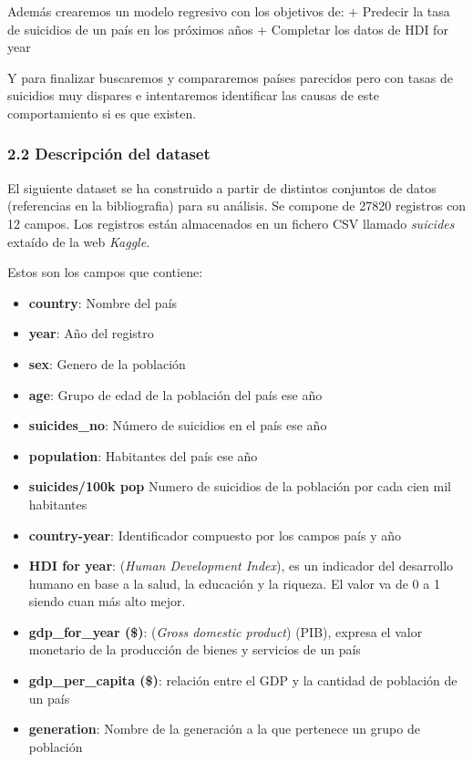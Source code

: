 \documentclass[]{article}
\providecommand{\tightlist}{%
  \setlength{\itemsep}{0pt}\setlength{\parskip}{0pt}}
\begin{document}
Además crearemos un modelo regresivo con los objetivos de: + Predecir la
tasa de suicidios de un país en los próximos años + Completar los datos
de HDI for year

Y para finalizar buscaremos y compararemos países parecidos pero con
tasas de suicidios muy dispares e intentaremos identificar las causas de
este comportamiento si es que existen.

\hypertarget{descripcion-del-dataset}{%
\subsubsection{2.2 Descripción del
dataset}\label{descripcion-del-dataset}}

El siguiente dataset se ha construido a partir de distintos conjuntos de
datos (referencias en la bibliografia) para su análisis. Se compone de
27820 registros con 12 campos. Los registros están almacenados en un
fichero CSV llamado \emph{suicides} extaído de la web \emph{Kaggle}.

Estos son los campos que contiene:

\begin{itemize}
\tightlist
\item
  \textbf{country}: Nombre del país
\item
  \textbf{year}: Año del registro
\item
  \textbf{sex}: Genero de la población
\item
  \textbf{age}: Grupo de edad de la población del país ese año
\item
  \textbf{suicides\_no}: Número de suicidios en el país ese año
\item
  \textbf{population}: Habitantes del país ese año
\item
  \textbf{suicides/100k pop} Numero de suicidios de la población por
  cada cien mil habitantes
\item
  \textbf{country-year}: Identificador compuesto por los campos país y
  año
\item
  \textbf{HDI for year}: (\emph{Human Development Index}), es un
  indicador del desarrollo humano en base a la salud, la educación y la
  riqueza. El valor va de 0 a 1 siendo cuan más alto mejor.
\item
  \textbf{gdp\_for\_year (\$)}: (\emph{Gross domestic product}) (PIB),
  expresa el valor monetario de la producción de bienes y servicios de
  un país
\item
  \textbf{gdp\_per\_capita (\$)}: relación entre el GDP y la cantidad de
  población de un país
\item
  \textbf{generation}: Nombre de la generación a la que pertenece un
  grupo de población
\end{itemize}
\end{document}
